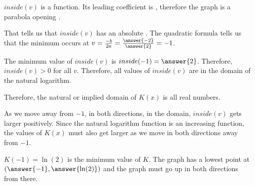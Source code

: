 \documentclass{ximera}
\begin{document}
\begin{observation}
$inside(v)$ is a   function.  Its leading coefficient is , therefore the graph is a parabola opening  .  


That tells us that $inside(v)$ has an absolute .  The quadratic formula tells us that the minimum occurs at $v=\frac{-b}{2a} = \frac{\answer{-2}}{\answer{2}} = -1$.

The minimum value of $inside(v)$ is $inside(-1) = \answer{2}$.  Therefore, $inside(v) > 0$ for all $v$. Therefore, all values of $inside(v)$ are in the domain of the natural logarithm.

Therefore, the natural or implied domain of $K(x)$ is all real numbers.
\end{observation}


As we move away from $-1$, in both directions, in the domain, $inside(v)$ gets larger positively. Since the natural logarithm function is an increasing function, the values of $K(x)$ must also get larger as we move in both directions away from $-1$.



\begin{conclusion}
$K(-1) = \ln(2)$ is the minimum value of $K$.  The graph has a lowest point at $\left( \answer{-1}, \answer{\ln(2)} \right)$ and the graph must go up in both directions from there.
\end{conclusion}
\end{document}
